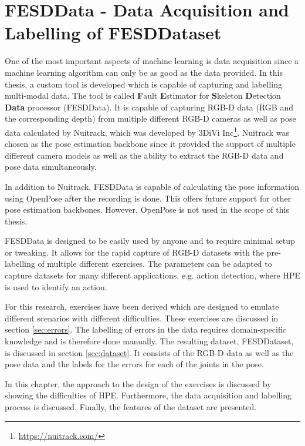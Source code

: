 \chapter[FESDData]{FESDData - Data Acquisition and Labelling of FESDDataset}
\label{sec:data_processing}

One of the most important aspects of machine learning is data acquisition since a machine learning algorithm can only be as good as the data provided. In this thesis, a custom tool is developed which is capable of capturing and labelling multi-modal data. The tool is called \textbf{F}ault \textbf{E}stimator for \textbf{S}keleton \textbf{D}etection \textbf{Data} processor (FESDData). It is capable of capturing RGB-D data (RGB and the corresponding depth) from multiple different RGB-D cameras as well as pose data calculated by Nuitrack, which was developed by 3DiVi Inc\footnote{\url{https://nuitrack.com/}}. Nuitrack was chosen as the pose estimation backbone since it provided the support of multiple different camera models as well as the ability to extract the RGB-D data and pose data simultaneously.

In addition to Nuitrack, FESDData is capable of calculating the pose information using OpenPose after the recording is done. This offers future support for other pose estimation backbones. However, OpenPose is not used in the scope of this thesis.

FESDData is designed to be easily used by anyone and to require minimal setup or tweaking. It allows for the rapid capture of RGB-D datasets with the pre-labelling of multiple different exercises. The parameters can be adapted to capture datasets for many different applications, e.g. action detection, where HPE is used to identify an action. 

For this research, exercises have been derived which are designed to emulate different scenarios with different difficulties. These exercises are discussed in section \ref{sec:errors}. The labelling of errors in the data requires domain-specific knowledge and is therefore done manually. The resulting dataset, FESDDataset, is discussed in section \ref{sec:dataset}. It consists of the RGB-D data as well as the pose data and the labels for the errors for each of the joints in the pose.

In this chapter, the approach to the design of the exercises is discussed by showing the difficulties of HPE. Furthermore, the data acquisition and labelling process is discussed. Finally, the features of the dataset are presented.







